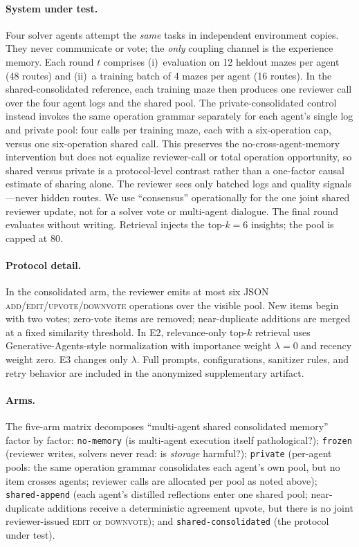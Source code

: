 \documentclass[letterpaper]{article} %
\begin{document}
\paragraph{System under test.}
Four solver agents attempt the \emph{same} tasks in independent environment copies. They
never communicate or vote; the \emph{only} coupling channel is the experience memory. Each
round $t$ comprises (i)~evaluation on 12 heldout mazes per agent (48 routes) and
(ii)~a training batch of 4 mazes per agent (16 routes). In the shared-consolidated
reference, each training maze then produces one reviewer call over the four agent logs and
the shared pool. The private-consolidated control instead invokes the same operation grammar
separately for each agent's single log and private pool: four calls per training maze, each
with a six-operation cap, versus one six-operation shared call. This preserves the
no-cross-agent-memory intervention but does not equalize reviewer-call or total operation
opportunity, so shared versus private is a protocol-level contrast rather than a one-factor
causal estimate of sharing alone. The reviewer sees only batched logs and quality
signals---never hidden routes. We use ``consensus'' operationally for the one joint shared
reviewer update, not for a solver vote or multi-agent dialogue. The final round evaluates
without writing. Retrieval injects the top-$k{=}6$ insights; the pool is capped at 80.

\paragraph{Protocol detail.}
In the consolidated arm, the reviewer emits at most six JSON
\textsc{add}/\textsc{edit}/\textsc{upvote}/\textsc{downvote} operations over the visible
pool. New items begin with two votes; zero-vote items are removed; near-duplicate additions
are merged at a fixed similarity threshold. In E2, relevance-only top-$k$ retrieval uses
Generative-Agents-style normalization with importance weight $\lambda{=}0$ and recency weight
zero. E3 changes only $\lambda$. Full prompts, configurations, sanitizer rules, and retry
behavior are included in the anonymized supplementary artifact.

\paragraph{Arms.}
The five-arm matrix decomposes ``multi-agent shared consolidated memory'' factor by factor:
\texttt{no-memory} (is multi-agent execution itself pathological?); \texttt{frozen} (reviewer
writes, solvers never read: is \emph{storage} harmful?); \texttt{private} (per-agent pools:
the same operation grammar consolidates each agent's own pool, but no item crosses agents;
reviewer calls are allocated per pool as noted above); \texttt{shared-append} (each agent's
distilled reflections enter one shared pool; near-duplicate additions receive a deterministic
agreement upvote, but there is no joint reviewer-issued \textsc{edit} or
\textsc{downvote}); and \texttt{shared-consolidated} (the protocol under test).
\end{document}
